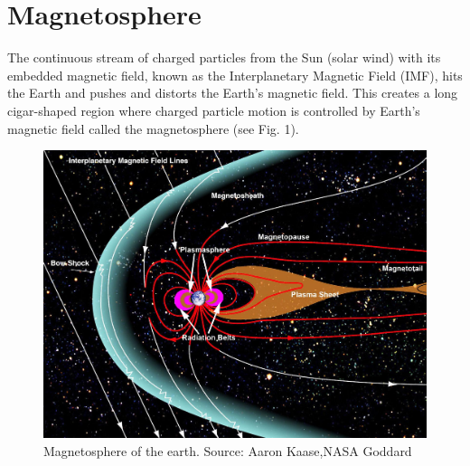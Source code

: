 \section{Magnetosphere} 
The continuous stream of charged particles from the Sun (solar wind) with its embedded magnetic field, known as the Interplanetary Magnetic Field (IMF), hits the Earth and pushes and distorts the Earth’s magnetic field. This creates a long cigar-shaped region where charged particle motion is controlled by Earth’s magnetic field called the magnetosphere (see Fig. 1). 
\begin{figure}[t]
	\centering\includegraphics[width=32pc]{magne.jpg}
	\caption{Magnetosphere of the earth. Source: Aaron Kaase,NASA Goddard}
	\label{fig:magnetosphere}
\end{figure}


